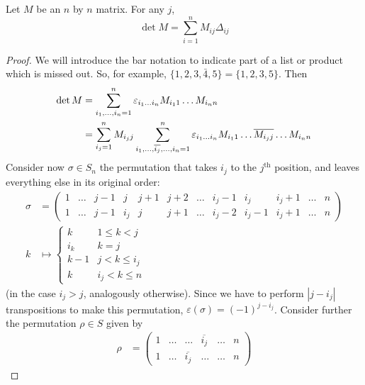 \documentclass{../template/note}
\begin{document}
    \begin{theorem}
        Let \(M\) be an \(n\) by \(n\) matrix. For any \(j\),
        \[
            \det M = \sum_{i=1}^n M_{ij} \Delta_{ij}
        \]
    \end{theorem}
    
    \begin{proof}
        We will introduce the bar notation to indicate part of a list or product which is missed out. So, for example, \(\{1, 2, 3, \bar 4, 5\} = \{1, 2, 3, 5\}\). Then
        \begin{align*}
            \det M &= \sum_{i_1, \dots, i_n = 1}^n \varepsilon_{i_1 \dots i_n}M_{i_11}\dots M_{i_nn} \\
            &= \sum_{i_j=1}^n M_{i_jj} \sum_{i_1, \dots, \overline{i_j}, \dots, i_n=1}^n \varepsilon_{i_1 \dots i_n} M_{i_11} \dots \overline{M_{i_jj}} \dots M_{i_nn}
        \end{align*}
        Consider now \(\sigma \in S_n\) the permutation that takes \(i_j\) to the \(j^\text{th}\) position, and leaves everything else in its original order:
        \begin{align*}
            \sigma &= \begin{pmatrix}
             1 & \dots & j-1 & j & j+1 & j+2 & \dots & i_j-1 & i_j & i_j+1 & \dots & n \\
             1 & \dots & j-1 & i_j & j & j+1 & \dots & i_j-2 & i_j-1 & i_j+1 & \dots & n
            \end{pmatrix} \\
            k &\mapsto \begin{cases}
                k & 1 \leq k < j \\
                i_k & k = j \\
                k-1 & j < k \leq i_j \\
                k & i_j < k \leq n
            \end{cases}
        \end{align*}
        (in the case \(i_j > j\), analogously otherwise). Since we have to perform \(|j - i_j|\) transpositions to make this permutation, \(\varepsilon(\sigma) = (-1)^{j - i_j}\). Consider further the permutation \(\rho \in S\) given by
        \begin{align*}
            \rho &= \begin{pmatrix}
             1 & \dots & \dots & \overline{i_j} & \dots & n \\
             1 & \dots & \overline{i_j} & \dots & \dots & n 

\end{pmatrix}
\end{align*}
\end{proof}
\end{document}

